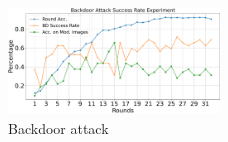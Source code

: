 \documentclass[conference]{IEEEtran}
\def\figBackdoorAttack{0.5\textwidth}
\begin{document}
\begin{figure}[htbp]
    \centerline{\includegraphics[width=\figBackdoorAttack]{pics/003-backdoorAttack.pdf}}
    \vspace{-10px}  %
    \caption{Backdoor attack\vspace{-8px}}
    \label{fig:backdoorAttack}
\end{figure}

\end{document}
